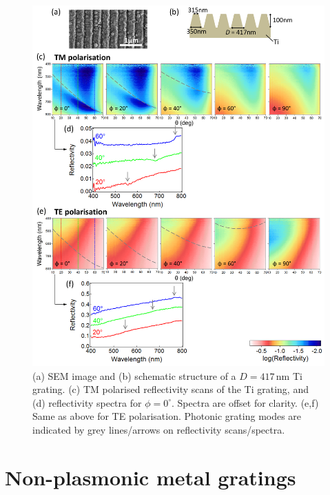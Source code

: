 \begin{figure}[h!] 
\centering    
\includegraphics[width=\textwidth]{Fig4}
\caption[(a) SEM image and (b) schematic structure of $D=417$\,nm Ti grating. Reflectivity measurements of Ti grating in (c,d) TM and (e.f) TE polarisation.]{(a) SEM image and (b) schematic structure of a $D=417$\,nm Ti grating. (c) TM polarised reflectivity scans of the Ti grating, and (d) reflectivity spectra for $\phi=0^{\circ}$. Spectra are offset for clarity. (e,f) Same as above for TE polarisation. Photonic grating modes are indicated by grey lines/arrows on reflectivity scans/spectra.}
\label{7Fig4}
\end{figure}
\section{Non-plasmonic metal gratings}
